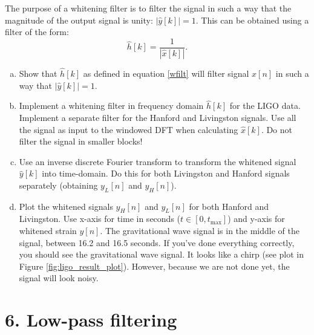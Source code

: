 The purpose of a whitening filter is to filter the signal in such a way that the
magnitude of the output signal is unity: $|\hat{y}[k]|=1$. This can be  obtained using a filter of the form:
\begin{equation}
  \hat{h}[k]=\frac{1}{|\hat{x}[k]|}.
  \label{wfilt}
\end{equation}
\begin{enumerate}[a)]

  \item Show that $\hat{h}[k]$ as defined in equation \ref{wfilt} will filter
        signal $x[n]$ in such a way that $|\hat{y}[k]|=1$.


  \item Implement a whitening filter in frequency domain $\hat{h}[k]$
        for the LIGO data. Implement a separate filter for the Hanford and
        Livingston signals. Use all the signal as input to the windowed
        DFT when calculating $\hat{x}[k]$. Do not filter the signal in
        smaller blocks!

  \item Use an inverse discrete Fourier transform to transform the
        whitened signal $\hat{y}[k]$ into time-domain. Do this for both
        Livingston and Hanford signals separately (obtaining $y_L[n]$ and
        $y_H[n]$).

  \item Plot the whitened signals $y_H[n]$ and $y_L[n]$ for both Hanford
        and Livingston. Use x-axis for time in seconds
        ($t\in[0,t_{\mathrm{max}}]$) and y-axis for whitened strain
        $y[n]$. The gravitational wave signal is in the middle of the
        signal, between 16.2 and 16.5 seconds. If you've done everything
        correctly, you should see the gravitational wave signal. It looks
        like a chirp (see plot in Figure \ref{fig:ligo_result_plot}).
        However, because we are not done yet, the signal will look noisy.

\end{enumerate}

\section{6. Low-pass filtering}

